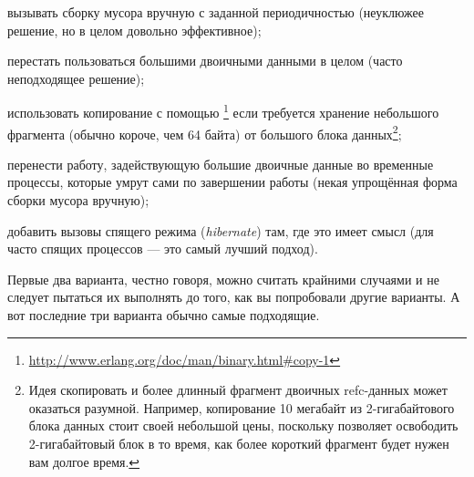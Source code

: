 \documentclass[11pt, oneside]{book}   	%
\begin{document}
\begin{itemize*}
	\item вызывать сборку мусора вручную с заданной периодичностью (неуклюжее решение, но в целом довольно эффективное);
	\item перестать пользоваться большими двоичными данными в целом (часто неподходящее решение);
	\item использовать копирование с помощью \footnote{\href{http://www.erlang.org/doc/man/binary.html\#copy-1}{http://www.erlang.org/doc/man/binary.html\#copy-1}} если требуется хранение небольшого фрагмента (обычно короче, чем 64 байта) от большого блока данных\footnote{Идея скопировать и более длинный фрагмент двоичных refc-данных может оказаться разумной. Например, копирование 10 мегабайт из 2-гигабайтового блока данных стоит своей небольшой цены, поскольку позволяет освободить 2-гигабайтовый блок в то время, как более короткий фрагмент будет нужен вам долгое время.};
	\item перенести работу, задействующую большие двоичные данные во временные процессы, которые умрут сами по завершении работы (некая упрощённая форма сборки мусора вручную);
	\item добавить вызовы спящего режима (\emph{hibernate}) там, где это имеет смысл (для часто спящих процессов --- это самый лучший подход).
\end{itemize*}

Первые два варианта, честно говоря, можно считать крайними случаями и не следует пытаться их выполнять до того, как вы попробовали другие варианты. А вот последние три варианта обычно самые подходящие.
\end{document}
